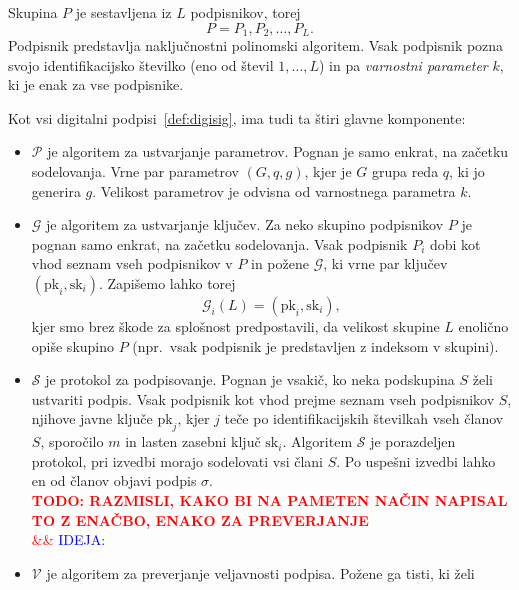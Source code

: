 \documentclass[isrm2, tisk]{fmfdelo}
\newcommand{\todo}[2][]{%
    \textcolor{red}{%
        \\ \textbf{\uppercase{todo: #2}}%
        \\%
        \ifx&#1&%
        \else%
            \textcolor{blue}{\uppercase{ideja:} #1}%
            \\%
        \fi%
    }%
}
\begin{document}
\begin{definicija} 
    Skupina $P$ je sestavljena iz $L$ podpisnikov, torej
    $$ 
    P = P_1, P_2, \dots, P_L.
    $$
    Podpisnik predstavlja naključnostni polinomski algoritem. Vsak podpisnik pozna svojo 
    identifikacijsko številko (eno od števil $1, \dots, L$) in pa \textit{varnostni parameter} $k$, 
    ki je enak za vse podpisnike.

    Kot vsi digitalni podpisi~\ref{def:digisig}, ima tudi ta štiri glavne komponente: 
    \begin{itemize}
        \item $\mathcal{P}$ je algoritem za ustvarjanje parametrov. Pognan je samo enkrat, na začetku 
            sodelovanja. Vrne par parametrov $(G, q, g)$, kjer je $G$ grupa reda $q$, ki jo generira 
            $g$. Velikost parametrov je odvisna od varnostnega parametra $k$.
        \item $\mathcal{G}$ je algoritem za ustvarjanje ključev. Za neko skupino podpisnikov $P$ je pognan samo 
            enkrat, na začetku sodelovanja. Vsak podpisnik $P_i$ dobi kot vhod seznam vseh podpisnikov v $P$ 
            in požene $\mathcal{G}$, ki vrne par ključev $(\text{pk}_i, \text{sk}_i)$. Zapišemo lahko torej 
            $$ 
            \mathcal{G}_i(L) = (\text{pk}_i, \text{sk}_i),
            $$
            kjer smo brez škode za splošnost predpostavili, da velikost skupine $L$ enolično opiše 
            skupino $P$ (npr.\ vsak podpisnik je predstavljen z indeksom v skupini).
        \item $\mathcal{S}$ je protokol za podpisovanje. Pognan je vsakič, ko neka podskupina $S$ želi 
            ustvariti podpis. Vsak podpisnik kot vhod prejme seznam vseh podpisnikov $S$, njihove 
            javne ključe $\text{pk}_j$, kjer $j$ teče po identifikacijskih številkah vseh članov $S$, 
            sporočilo $m$ in lasten zasebni ključ $\text{sk}_i$. Algoritem $\mathcal{S}$ je porazdeljen 
            protokol, pri izvedbi morajo sodelovati vsi člani $S$. Po uspešni izvedbi lahko en od članov 
            objavi podpis $\sigma$.
            \todo{razmisli, kako bi na pameten način napisal to z enačbo, enako za preverjanje}
        \item $\mathcal{V}$ je algoritem za preverjanje veljavnosti podpisa. Požene ga tisti, ki želi 

\end{itemize}
\end{definicija}
\end{document}
